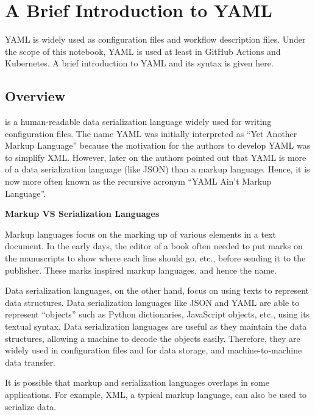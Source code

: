 \chapter{A Brief Introduction to YAML} \label{ch:yaml}

YAML is widely used as configuration files and workflow description files. Under the scope of this notebook, YAML is used at least in GitHub Actions and Kubernetes. A brief introduction to YAML and its syntax is given here.

\section{Overview}

 is a human-readable data serialization language widely used for writing configuration files. The name YAML was initially interpreted as ``Yet Another Markup Language'' because the motivation for the authors to develop YAML was to simplify XML. However, later on the authors pointed out that YAML is more of a data serialization language (like JSON) than a markup language. Hence, it is now more often known as the recursive acronym ``YAML Ain't Markup Language''.

\begin{mdframed}
\noindent \textbf{Markup VS Serialization Languages}

Markup languages focus on the marking up of various elements in a text document. In the early days, the editor of a book often needed to put marks on the manuscripts to show where each line should go, etc., before sending it to the publisher. These marks inspired markup languages, and hence the name.

Data serialization languages, on the other hand, focus on using texts to represent data structures. Data serialization languages like JSON and YAML are able to represent ``objects'' such as Python dictionaries, JavaScript objects, etc., using its textual syntax. Data serialization languages are useful as they maintain the data structures, allowing a machine to decode the objects easily. Therefore, they are widely used in configuration files and for data storage, and machine-to-machine data transfer.

It is possible that markup and serialization languages overlaps in some applications. For example, XML, a typical markup language, can also be used to serialize data.

\end{mdframed}

